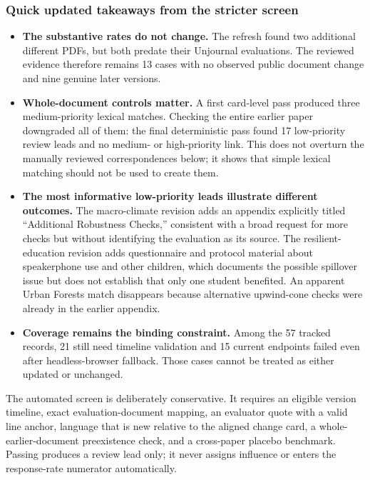 \documentclass[
  11pt,
  letterpaper,
]{article}
\providecommand{\tightlist}{%
  \setlength{\itemsep}{0pt}\setlength{\parskip}{0pt}}
\begin{document}
\subsubsection{Quick updated takeaways from the stricter
screen}\label{quick-updated-takeaways-from-the-stricter-screen}

\begin{itemize}
\tightlist
\item
  \textbf{The substantive rates do not change.} The refresh found two
  additional different PDFs, but both predate their Unjournal
  evaluations. The reviewed evidence therefore remains 13 cases with no
  observed public document change and nine genuine later versions.
\item
  \textbf{Whole-document controls matter.} A first card-level pass
  produced three medium-priority lexical matches. Checking the entire
  earlier paper downgraded all of them: the final deterministic pass
  found 17 low-priority review leads and no medium- or high-priority
  link. This does not overturn the manually reviewed correspondences
  below; it shows that simple lexical matching should not be used to
  create them.
\item
  \textbf{The most informative low-priority leads illustrate different
  outcomes.} The macro-climate revision adds an appendix explicitly
  titled ``Additional Robustness Checks,'' consistent with a broad
  request for more checks but without identifying the evaluation as its
  source. The resilient-education revision adds questionnaire and
  protocol material about speakerphone use and other children, which
  documents the possible spillover issue but does not establish that
  only one student benefited. An apparent Urban Forests match disappears
  because alternative upwind-cone checks were already in the earlier
  appendix.
\item
  \textbf{Coverage remains the binding constraint.} Among the 57 tracked
  records, 21 still need timeline validation and 15 current endpoints
  failed even after headless-browser fallback. Those cases cannot be
  treated as either updated or unchanged.
\end{itemize}

The automated screen is deliberately conservative. It requires an
eligible version timeline, exact evaluation-document mapping, an
evaluator quote with a valid line anchor, language that is new relative
to the aligned change card, a whole-earlier-document preexistence check,
and a cross-paper placebo benchmark. Passing produces a review lead
only; it never assigns influence or enters the response-rate numerator
automatically.
\end{document}
